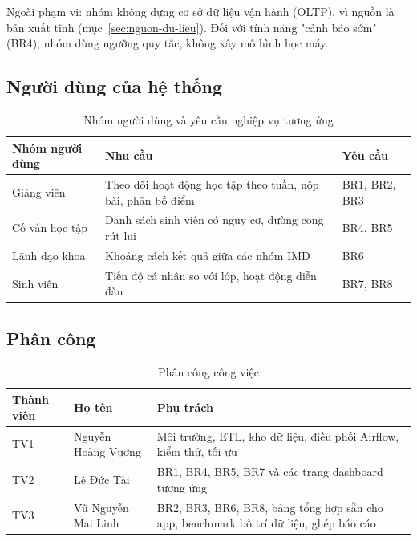 Ngoài phạm vi: nhóm không dựng cơ sở dữ liệu vận hành (OLTP), vì nguồn là bản xuất
tĩnh (mục~\ref{sec:nguon-du-lieu}). Đối với tính năng "cảnh báo sớm" (BR4), nhóm dùng ngưỡng quy tắc, không xây mô hình học máy.

\subsection{Người dùng của hệ thống}
\begin{table}[htbp]
\centering
\begin{tabularx}{\textwidth}{|l|X|l|}
\hline
\textbf{Nhóm người dùng} & \textbf{Nhu cầu} & \textbf{Yêu cầu} \\ \hline
Giảng viên & Theo dõi hoạt động học tập theo tuần, nộp bài, phân bố điểm & BR1, BR2, BR3 \\ \hline
Cố vấn học tập & Danh sách sinh viên có nguy cơ, đường cong rút lui & BR4, BR5 \\ \hline
Lãnh đạo khoa & Khoảng cách kết quả giữa các nhóm IMD & BR6 \\ \hline
Sinh viên & Tiến độ cá nhân so với lớp, hoạt động diễn đàn & BR7, BR8 \\ \hline
\end{tabularx}
\caption{Nhóm người dùng và yêu cầu nghiệp vụ tương ứng}
\label{tab:nguoi-dung}
\end{table}

\subsection{Phân công}
\begin{table}[htbp]
\centering
\begin{tabularx}{\textwidth}{|l|l|X|}
\hline
\textbf{Thành viên} & \textbf{Họ tên} & \textbf{Phụ trách} \\ \hline
TV1 & Nguyễn Hoàng Vương
& Môi trường, ETL, kho dữ liệu, điều phối Airflow, kiểm thử, tối ưu \\ \hline
TV2 & Lê Đức Tài
& BR1, BR4, BR5, BR7 và các trang dashboard tương ứng \\ \hline
TV3 & Vũ Nguyễn Mai Linh
& BR2, BR3, BR6, BR8, bảng tổng hợp sẵn cho app, benchmark bố trí dữ liệu, ghép báo cáo \\ \hline
\end{tabularx}
\caption{Phân công công việc}
\label{tab:phan-cong}
\end{table}
